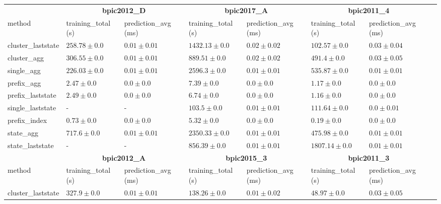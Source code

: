 \begin{table}[!htbp]
{\begin{tabular}{llllllll}
				 \bottomrule
				 \toprule
				 & \multicolumn{2}{c}{{\bfseries bpic2012\_D}} & \multicolumn{2}{c}{{\bfseries bpic2017\_A}} & \multicolumn{2}{c}{{\bfseries bpic2011\_4}} \\ \cmidrule(lr){2-3} \cmidrule(lr){4-5} \cmidrule(lr){6-7}
				 method  & training\_total (s) & prediction\_avg (ms) & training\_total (s) & prediction\_avg (ms) & training\_total (s) & prediction\_avg (ms) \\ \midrule
				 cluster\_laststate & $258.78 \pm 0.0$ & $0.01 \pm 0.01$ & $1432.13 \pm 0.0$ & $0.02 \pm 0.02$ & $102.57 \pm 0.0$ & $0.03 \pm 0.04$ \\ 
				 cluster\_agg & $306.55 \pm 0.0$ & $0.01 \pm 0.01$ & $889.51 \pm 0.0$ & $0.02 \pm 0.02$ & $491.4 \pm 0.0$ & $0.03 \pm 0.05$ \\ 
				 single\_agg & $226.03 \pm 0.0$ & $0.01 \pm 0.01$ & $2596.3 \pm 0.0$ & $0.01 \pm 0.01$ & $535.87 \pm 0.0$ & $0.01 \pm 0.01$ \\ 
				 prefix\_agg & $2.47 \pm 0.0$ & $\mathbf{0.0 \pm 0.0}$ & $7.39 \pm 0.0$ & $\mathbf{0.0 \pm 0.0}$ & $1.17 \pm 0.0$ & $\mathbf{0.0 \pm 0.0}$ \\ 
				 prefix\_laststate & $2.49 \pm 0.0$ & $\mathbf{0.0 \pm 0.0}$ & $6.74 \pm 0.0$ & $\mathbf{0.0 \pm 0.0}$ & $1.16 \pm 0.0$ & $\mathbf{0.0 \pm 0.0}$ \\ 
				 single\_laststate & - & - & $103.5 \pm 0.0$ & $0.01 \pm 0.01$ & $111.64 \pm 0.0$ & $\mathbf{0.0 \pm 0.01}$ \\ 
				 prefix\_index & $\mathbf{0.73 \pm 0.0}$ & $\mathbf{0.0 \pm 0.0}$ & $\mathbf{5.32 \pm 0.0}$ & $\mathbf{0.0 \pm 0.0}$ & $\mathbf{0.19 \pm 0.0}$ & $\mathbf{0.0 \pm 0.0}$ \\ 
				 state\_agg & $717.6 \pm 0.0$ & $0.01 \pm 0.01$ & $2350.33 \pm 0.0$ & $0.01 \pm 0.01$ & $475.98 \pm 0.0$ & $0.01 \pm 0.01$ \\ 
				 state\_laststate & - & - & $856.39 \pm 0.0$ & $0.01 \pm 0.01$ & $1807.14 \pm 0.0$ & $0.01 \pm 0.01$ \\ 
				 \bottomrule
				 \toprule
				 & \multicolumn{2}{c}{{\bfseries bpic2012\_A}} & \multicolumn{2}{c}{{\bfseries bpic2015\_3}} & \multicolumn{2}{c}{{\bfseries bpic2011\_3}} \\ \cmidrule(lr){2-3} \cmidrule(lr){4-5} \cmidrule(lr){6-7}
				 method  & training\_total (s) & prediction\_avg (ms) & training\_total (s) & prediction\_avg (ms) & training\_total (s) & prediction\_avg (ms) \\ \midrule
				 cluster\_laststate & $327.9 \pm 0.0$ & $0.01 \pm 0.01$ & $138.26 \pm 0.0$ & $0.01 \pm 0.02$ & $48.97 \pm 0.0$ & $0.03 \pm 0.05$ \\ 

\end{tabular}}
\end{table}
